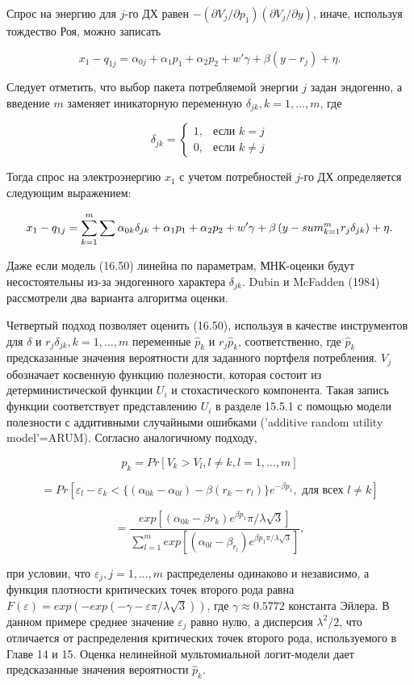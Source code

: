 Спрос на энергию для $j$-го ДХ равен $-(\partial{V_j}/\partial{p_1})(\partial{V_j}/\partial{y})$, иначе, используя тождество Роя, можно записать


\[
x_1-q_{1j}=\alpha_{0j}+\alpha_{1}p_1+\alpha_2{p_2}+w'\gamma+\beta(y-r_j)+\eta.
\]

Следует отметить, что выбор пакета потребляемой энергии $j$ задан эндогенно, а введение $m$ заменяет иникаторную переменную $\delta_{jk},k=1,...,m$, где

\[
\delta_{jk}=
	\begin{cases}
	1, & \text{если }k=j\\
	0, & \text{если }k{\neq}j
	\end{cases}
\]

Тогда спрос на электроэнергию $x_1$ с учетом потребностей $j$-го ДХ определяется следующим выражением:

\begin{equation}
x_1-q_{1j}=\sum_{k=1}^m 
\sum\alpha_{0k}\delta_{jk}+\alpha_{1}p_1+\alpha_{2}p_2+w'\gamma+\beta\left(y-\\sum_{k=1}^{m}{r_j\delta_{jk}}\right)+\eta.
\end{equation}

Даже если модель (16.50) линейна по параметрам, МНК-оценки будут несостоятельны из-за эндогенного характера $\delta_{jk}$. Dubin и McFadden (1984) рассмотрели два варианта алгоритма оценки.

Четвертый подход позволяет оценить (16.50), используя в качестве инструментов для $\delta$ и $r_j\delta_{jk},k=1,...,m$ переменные $\hat{p}_k$ и $r_{j}\hat{p}_k$, соответственно, где $\hat{p}_k$  предсказанные значения вероятности для заданного портфеля потребления. $V_j$ обозначает косвенную функцию полезности, которая состоит из детерминистической функции $U_i$ и стохастического компонента. Такая запись функции соответствует представлению $U_i$ в разделе 15.5.1 с помощью модели полезности с аддитивными случайными ошибками ('additive random utility model'=ARUM). Согласно аналогичному подходу, 

\[
p_k=Pr[V_k>V_l,l{\neq}k,l=1,...,m]
\]

\[
=Pr[\varepsilon_l-\varepsilon_k<\lbrace(\alpha_{0k}-\alpha_{0l})-\beta(r_k-r_l)\rbrace{e^{-\beta{p_1}}},\text{ для всех } l{\neq}k]
\]

\[
=\dfrac{exp[(\alpha_{0k}-\beta{r_k})e^{\beta{p_1}}\pi/\lambda\sqrt{3}]}{\sum_{l=1}^{m} exp[(\alpha_{0l}-\beta_{r_l})e^{\beta{p_1}\pi/\lambda\sqrt{3}}]},
\]


при условии, что $\varepsilon_j, j=1,...,m$ распределены одинаково и независимо, а функция плотности критических точек второго рода равна $F(\varepsilon)=exp(-exp(-\gamma-\varepsilon\pi/\lambda\sqrt{3}))$, где $\gamma{\approx}0.5772$ константа Эйлера. В данном примере среднее значение $\varepsilon_j$ равно нулю, а дисперсия $\lambda^2/2$, что отличается от распределения критических точек второго рода, используемого в Главе 14 и 15. Оценка нелинейной мультомиальной логит-модели дает предсказанные значения вероятности $\hat{p}_k$.

